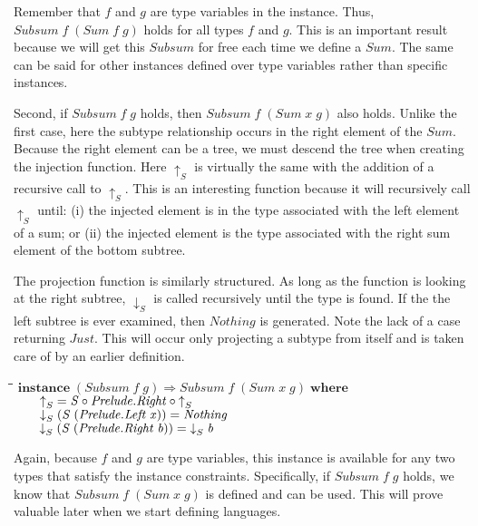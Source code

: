\documentclass[11pt]{article}
\newlength{\lwidth}\setlength{\lwidth}{4.5cm}
\newlength{\cwidth}\setlength{\cwidth}{8mm} %
\newcommand{\Conid}[1]{\mathit{#1}}
\newcommand{\Varid}[1]{\mathit{#1}}
\begin{document}
Remember that \ensuremath{\Varid{f}} and \ensuremath{\Varid{g}} are type variables in the instance.  Thus,
\ensuremath{\Conid{Subsum}\;\Varid{f}\;(\Conid{Sum}\;\Varid{f}\;\Varid{g})} holds for all types \ensuremath{\Varid{f}} and \ensuremath{\Varid{g}}.  This is an
important result because we will get this \ensuremath{\Conid{Subsum}} for free each time
we define a \ensuremath{\Conid{Sum}}. The same can be said for other instances defined
over type variables rather than specific instances.

Second, if \ensuremath{\Conid{Subsum}\;\Varid{f}\;\Varid{g}} holds, then \ensuremath{\Conid{Subsum}\;\Varid{f}\;(\Conid{Sum}\;\Varid{x}\;\Varid{g})} also
holds. Unlike the first case, here the subtype relationship occurs in
the right element of the \ensuremath{\Conid{Sum}}.  Because the right element can be a
tree, we must descend the tree when creating the injection function.
Here \ensuremath{\Varid{\uparrow}_{S}} is virtually the same with the addition of a recursive
call to \ensuremath{\Varid{\uparrow}_{S}}.  This is an interesting function because it will
recursively call \ensuremath{\Varid{\uparrow}_{S}} until: (i) the injected element is in the type
associated with the left element of a sum; or (ii) the injected
element is the type associated with the right sum element of the
bottom subtree.

The projection function is similarly structured.  As long as the
function is looking at the right subtree, \ensuremath{\Varid{\downarrow}_{S}} is called recursively
until the type is found.  If the the left subtree is ever examined,
then \ensuremath{\Conid{Nothing}} is generated.  Note the lack of a case returning
\ensuremath{\Conid{Just}}. This will occur only projecting a subtype from itself and is
taken care of by an earlier definition.

\begin{tabbing}
\qquad\=\hspace{\lwidth}\=\hspace{\cwidth}\=\+\kill
${\mathbf{instance}\;(\Conid{Subsum}\;\Varid{f}\;\Varid{g})\Rightarrow \Conid{Subsum}\;\Varid{f}\;(\Conid{Sum}\;\Varid{x}\;\Varid{g})\;\mathbf{where}}$\\
${\hskip2.00em\relax\Varid{\uparrow}_{S}\mathrel{=}\Conid{S}\mathbin{\circ}\Conid{\Conid{Prelude}.Right}\mathbin{\circ}\Varid{\uparrow}_{S}}$\\
${\hskip2.00em\relax\Varid{\downarrow}_{S}\;(\Conid{S}\;(\Conid{\Conid{Prelude}.Left}\;\Varid{x}))\mathrel{=}\Conid{Nothing}}$\\
${\hskip2.00em\relax\Varid{\downarrow}_{S}\;(\Conid{S}\;(\Conid{\Conid{Prelude}.Right}\;\Varid{b}))\mathrel{=}\Varid{\downarrow}_{S}\;\Varid{b}}$
\end{tabbing}
Again, because \ensuremath{\Varid{f}} and \ensuremath{\Varid{g}} are type variables, this instance is
available for any two types that satisfy the instance constraints.
Specifically, if \ensuremath{\Conid{Subsum}\;\Varid{f}\;\Varid{g}} holds, we know that \ensuremath{\Conid{Subsum}\;\Varid{f}\;(\Conid{Sum}\;\Varid{x}\;\Varid{g})}
is defined and can be used.  This will prove valuable later when we
start defining languages.
\end{document}
